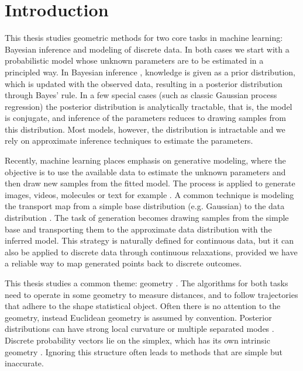 \chapter{Introduction}
This thesis studies geometric methods for two core tasks in machine learning: Bayesian inference and modeling of discrete data.  In both cases we start with a probabilistic model whose unknown parameters are to be estimated in a principled way. In Bayesian inference \citep{gelman1995bayesian}, knowledge is given as a prior distribution, which  is updated with the observed data, resulting in a posterior distribution through Bayes' rule. In a few special cases (such as classic Gaussian process regression) the posterior distribution is analytically tractable, that is, the model is conjugate, and inference of the parameters reduces to drawing samples from this distribution. Most models, however, the distribution is intractable and we rely on approximate inference techniques to estimate the parameters. 


Recently, machine learning places emphasis on generative modeling, where the objective is to use the available data  to estimate the unknown parameters and then draw new  samples from the fitted model. The process is applied to generate images, videos, molecules or text for example \citep{lipman2024flowmatchingguidecode}. A common technique is modeling the transport map from a simple base distribution (e.g. Gaussian) to the data distribution \citep{Lipman2023,Albergo2023, liu2023flow}. The task of generation becomes drawing samples from the simple base and transporting them to the approximate data distribution with the inferred model. This strategy is naturally defined for continuous data, but it can also be applied to discrete data through continuous relaxations, provided we have a reliable way to map generated points back to discrete outcomes.


This thesis studies a common theme: geometry \citep{Lee2018,amari2000methods}. 
The algorithms for both tasks need to operate in some geometry to measure distances, and to follow trajectories that adhere to the shape statistical object. 
Often there is no attention to the geometry, instead Euclidean geometry is assumed by convention. Posterior distributions can have strong local curvature \citep{Girolami2011} or multiple separated modes \citep{Lan2014}. Discrete probability vectors lie on the simplex, which has its own intrinsic geometry \citep{Aitchison1986}. Ignoring this structure often leads to methods that are simple but inaccurate.

